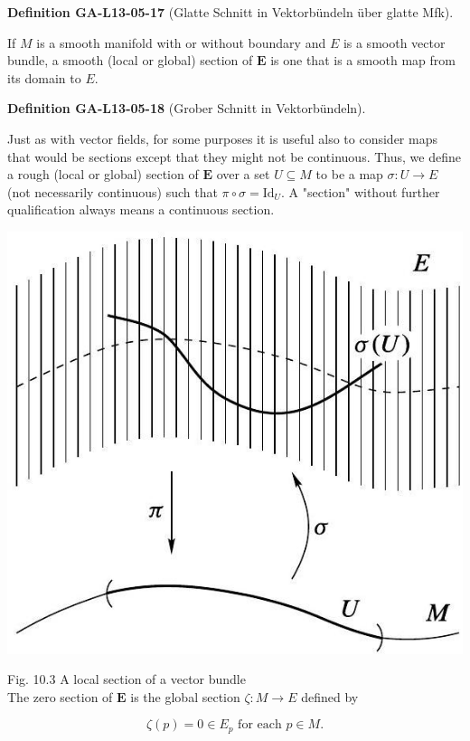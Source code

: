 \documentclass[10pt, letterpaper]{article}
\newcommand{\CustomHeading}[3]{%
  \par\medskip\noindent%
  \textbf{#1 #2} \textnormal{(#3)}.\enskip%
}
\newenvironment{DEF}[2]{\begin{unitbox}\CustomHeading{Definition}{#1}{#2}}{\end{unitbox}}
\begin{document}
\begin{DEF}{GA-L13-05-17}{Glatte Schnitt in Vektorbündeln über glatte Mfk}
If $M$ is a smooth manifold with or without boundary and $E$ is a smooth vector bundle, a smooth (local or global) section of $\boldsymbol{E}$ is one that is a smooth map from its domain to $E$.
\end{DEF}

\begin{DEF}{GA-L13-05-18}{Grober Schnitt in Vektorbündeln}
Just as with vector fields, for some purposes it is useful also to consider maps that would be sections except that they might not be continuous. Thus, we define a rough (local or global) section of $\boldsymbol{E}$ over a set $U \subseteq M$ to be a map $\sigma: U \rightarrow E$ (not necessarily continuous) such that $\pi \circ \sigma=\mathrm{Id}_{U}$. A "section" without further qualification always means a continuous section.
\end{DEF}


\includegraphics[scale=0.2, center]{2025_06_03_90f64b1a1e243cccc2e0g-274}

Fig. 10.3 A local section of a vector bundle\\


The zero section of $\boldsymbol{E}$ is the global section $\zeta: M \rightarrow E$ defined by

$$
\zeta(p)=0 \in E_{p} \text { for each } p \in M .
$$
\end{document}
